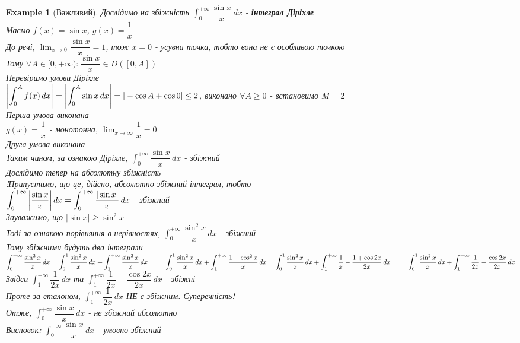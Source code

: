 \documentclass[a4paper, 14pt]{extarticle}
\def\huge{\displaystyle}
\def\bigline{\vspace{5mm}\\}
\theoremstyle{theoremdd}
\theoremstyle{theoremdd}
\theoremstyle{theoremdd}
\theoremstyle{theoremdd}
\newtheorem{example}[theorem]{Example}
\theoremstyle{theoremdd}
\theoremstyle{theoremdd}
\theoremstyle{theoremdd}
\theoremstyle{theoremdd}
\begin{document}
\begin{example}[Важливий]
Дослідимо на збіжність $\huge\int_0^{+\infty} \dfrac{\sin x}{x}\,dx$ - \textbf{інтеграл Діріхле}\\
Маємо $f(x) = \sin x$, $g(x) = \dfrac{1}{x}$\\
До речі, $\huge\lim_{x \to 0} \dfrac{\sin x}{x} = 1$, тож $x = 0$ - усувна точка, тобто вона не є особливою точкою\\
Тому $\forall A \in [0,+\infty): \dfrac{\sin x}{x} \in D([0,A])$\\
Перевіримо умови Діріхле\\
$\abs{\huge\int_0^{A} f(x)\,dx} = \abs{\huge\int_0^A \sin x \,dx} = |-\cos A + \cos 0| \leq 2$, виконано $\forall A \geq 0$ - встановимо $M = 2$\\
Перша умова виконана\\
$g(x) = \dfrac{1}{x}$ - монотонна, $\huge\lim_{x \to \infty} \dfrac{1}{x} = 0$\\
Друга умова виконана\\
Таким чином, за ознакою Діріхле,  $\huge\int_0^{+\infty} \dfrac{\sin x}{x}\,dx$  - збіжний
\bigline
Дослідимо тепер на абсолютну збіжність\\
!Припустимо, що це, дійсно, абсолютно збіжний інтеграл, тобто\\
$\huge\int_0^{+\infty} \abs{\dfrac{\sin x}{x}}\,dx = \huge\int_0^{+\infty} \dfrac{|\sin x|}{x}\,dx$ - збіжний\\
Зауважимо, що $|\sin x| \geq \sin^2 x$\\
Тоді за ознакою порівняння в нерівностях, $\huge\int_0^{+\infty} \dfrac{\sin^2 x}{x}\,dx$ - збіжний\\
Тому збіжними будуть два інтеграли\\
$\huge\int_0^{+\infty} \dfrac{\sin^2 x}{x}\,dx = \huge\int_0^1 \dfrac{\sin^2 x}{x}\,dx + \huge\int_1^{+\infty} \dfrac{\sin^2 x}{x}\,dx = \\ =
\huge\int_0^1 \dfrac{\sin^2 x}{x}\,dx + \huge\int_1^{+\infty} \dfrac{1 - \cos^2 x}{x}\,dx = \huge\int_0^1 \dfrac{\sin^2 x}{x}\,dx + \huge\int_1^{+\infty} \dfrac{1}{x} - \dfrac{1+\cos 2x}{2x} \,dx = \\
= \huge\int_0^1 \dfrac{\sin^2 x}{x}\,dx + \huge\int_1^{+\infty} \dfrac{1}{2x} - \dfrac{\cos 2x}{2x} \,dx$\\
Звідси $\huge\int_1^{+\infty} \dfrac{1}{2x} \,dx$ та $\huge\int_1^{+\infty} \dfrac{1}{2x}-\dfrac{\cos 2x}{2x} \,dx$ - збіжні\\
Проте за еталоном, $\huge\int_1^{+\infty} \dfrac{1}{2x} \,dx$ НЕ є збіжним. Суперечність!\\
Отже, $\huge\int_0^{+\infty} \dfrac{\sin x}{x}\,dx$ - не збіжний абсолютно\\
Висновок: $\huge\int_0^{+\infty} \dfrac{\sin x}{x}\,dx$ - умовно збіжний
\bigline
\end{example}
\end{document}
